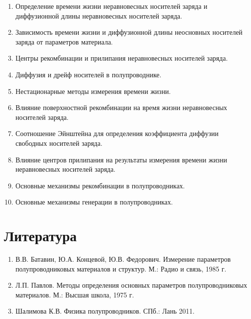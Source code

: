 \begin{enumerate}
\item Определение времени жизни неравновесных носителей заряда и диффузионной длины неравновесных носителей заряда.
\item Зависимость времени жизни и диффузионной длины неосновных носителей заряда от параметров материала.
\item Центры рекомбинации и прилипания неравновесных носителей заряда.
\item Диффузия и дрейф носителей в полупроводнике.
\item Нестационарные методы измерения времени жизни.
\item Влияние поверхностной рекомбинации на время жизни неравновесных носителей заряда.
\item Соотношение Эйнштейна для определения коэффициента диффузии свободных носителей заряда.
\item Влияние центров прилипания на результаты измерения времени жизни неравновесных носителей заряда.
\item Основные механизмы рекомбинации в полупроводниках.
\item Основные механизмы генерации в полупроводниках.
\end{enumerate}

\section{Литература}
\begin{enumerate}
\item В.В. Батавин, Ю.А. Концевой, Ю.В. Федорович. Измерение параметров полупроводниковых материалов и структур. М.: Радио и связь, 1985 г.
\item Л.П. Павлов. Методы определения основных параметров полупроводниковых материалов. М.: Высшая школа, 1975 г.
\item Шалимова К.В. Физика полупроводников. СПб.: Лань 2011.
\end{enumerate}
